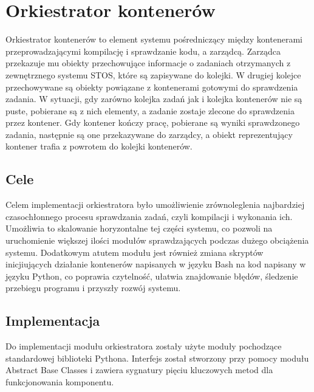 \section{Orkiestrator kontenerów}
Orkiestrator kontenerów to element systemu pośredniczący między kontenerami przeprowadzającymi kompilację i sprawdzanie kodu, a zarządcą. Zarządca przekazuje mu obiekty przechowujące informacje o zadaniach otrzymanych z zewnętrznego systemu STOS, które są zapisywane do kolejki. W drugiej kolejce przechowywane są obiekty powiązane z kontenerami gotowymi do sprawdzenia zadania. W sytuacji, gdy zarówno kolejka zadań jak i kolejka kontenerów nie są puste, pobierane są z nich elementy, a zadanie zostaje zlecone do sprawdzenia przez kontener. Gdy kontener kończy pracę, pobierane są wyniki sprawdzonego zadania, następnie są one przekazywane do zarządcy, a obiekt reprezentujący kontener trafia z powrotem do kolejki kontenerów.

\subsection{Cele}
Celem implementacji orkiestratora było umożliwienie zrównoleglenia najbardziej czasochłonnego procesu sprawdzania zadań, czyli kompilacji i wykonania ich. Umożliwia to skalowanie horyzontalne tej części systemu, co pozwoli na uruchomienie większej ilości modułów sprawdzających podczas dużego obciążenia systemu. Dodatkowym atutem modułu jest również zmiana skryptów inicjiujących działanie kontenerów napisanych w języku Bash na kod napisany w języku Python, co poprawia czytelność, ułatwia znajdowanie błędów, śledzenie przebiegu programu i przyszły rozwój systemu.


\subsection{Implementacja}
Do implementacji modułu orkiestratora zostały użyte moduły pochodzące standardowej biblioteki Pythona. Interfejs został stworzony przy pomocy modułu Abstract Base Classes\cite{pythonAbc} i zawiera sygnatury pięciu kluczowych metod dla funkcjonowania komponentu. 

